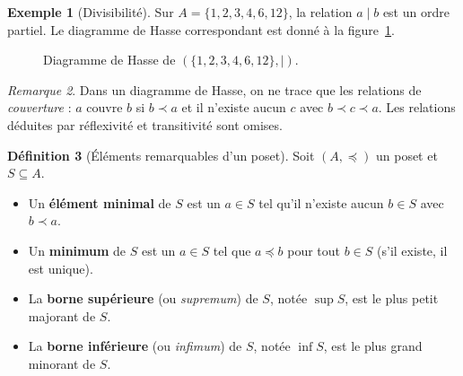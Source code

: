 \documentclass[12pt,a4paper,openany]{book}
\theoremstyle{definition}
\newtheorem{definition}{Définition}[chapter]
\newtheorem{exemple}[definition]{Exemple}
\theoremstyle{plain}
\theoremstyle{remark}
\newtheorem{remarque}[definition]{Remarque}
\begin{document}
\begin{exemple}[Divisibilité]\label{ex:divisibilite-poset}
Sur $A = \{1, 2, 3, 4, 6, 12\}$, la relation $a \mid b$ est un ordre
partiel. Le diagramme de Hasse correspondant est donné à la
figure~\ref{fig:hasse-div12}.
\end{exemple}

\begin{figure}[ht]
\centering
{}
\caption{Diagramme de Hasse de $(\{1,2,3,4,6,12\}, \mid)$.}
\label{fig:hasse-div12}
\end{figure}

\begin{remarque}\label{rem:hasse-convention}
Dans un diagramme de Hasse, on ne trace que les relations de
\emph{couverture} : $a$ couvre $b$ si $b \prec a$ et il n'existe aucun $c$
avec $b \prec c \prec a$. Les relations déduites par réflexivité et
transitivité sont omises.
\end{remarque}

\begin{definition}[Éléments remarquables d'un poset]\label{def:elements-poset}
Soit $(A, \preceq)$ un poset et $S \subseteq A$.
\begin{itemize}
  \item Un \textbf{élément minimal} de $S$ est un $a \in S$ tel qu'il
    n'existe aucun $b \in S$ avec $b \prec a$.
  \item Un \textbf{minimum} de $S$ est un $a \in S$ tel que $a \preceq b$
    pour tout $b \in S$ (s'il existe, il est unique).
  \item La \textbf{borne supérieure} (ou \emph{supremum}) de $S$, notée
    $\sup S$, est le plus petit majorant de $S$.
  \item La \textbf{borne inférieure} (ou \emph{infimum}) de $S$, notée
    $\inf S$, est le plus grand minorant de $S$.
\end{itemize}
\end{definition}
\end{document}

